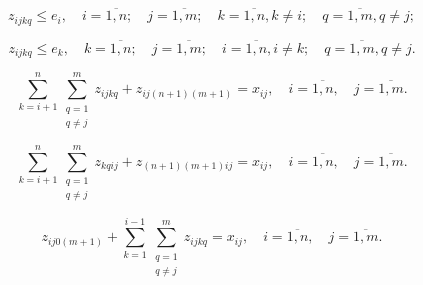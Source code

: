 \begin{equation}
  \label{eq:part3_z_ijkq_1}
  z_{ijkq} \leq e_i , \quad i = \overline{1, n}; \quad j = \overline{1, m}; \quad k = \overline{1,n}, k \neq i; \quad q = \overline{1,m}, q \neq j;
\end{equation}


\begin{equation}
  \label{eq:part3_z_ijkq_2}
  z_{ijkq} \leq e_k , \quad k = \overline{1, n}; \quad j = \overline{1, m}; \quad i = \overline{1,n}, i \neq k; \quad q = \overline{1,m}, q \neq j.
\end{equation}



\begin{equation}
  \label{eq:part3_z_ijkq_1_1}
  \sum\limits_{k=i+1}^{n} \sum\limits_{\substack{q = 1\\ q \neq j}}^m z_{ijkq} + z_{ij(n+1)(m+1)} = x_{ij} ,  \quad i = \overline{1, n}, \quad j = \overline{1, m}.
\end{equation}

\begin{equation}
  \label{eq:part3_z_ijkq_1_2}
  \sum\limits_{k=i+1}^{n} \sum\limits_{\substack{q = 1\\ q \neq j}}^m z_{kqij} + z_{(n+1)(m+1)ij} = x_{ij} ,  \quad i = \overline{1, n}, \quad j = \overline{1, m}.
\end{equation}


\begin{equation}
  \label{eq:part3_z_ijkq_2_1}
  z_{ij0(m+1)} + \sum\limits_{k=1}^{i-1} \sum\limits_{\substack{q = 1\\ q \neq j}}^m z_{ijkq}= x_{ij}, \quad i = \overline{1, n}, \quad j = \overline{1, m}.
\end{equation}

